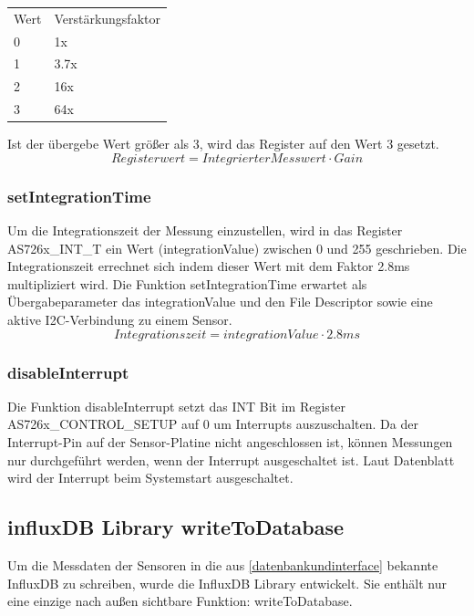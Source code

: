 \begin{tabular}{ l l}
 	Wert & Verstärkungsfaktor \\ 
 	0 & 1x \\  
 	1 & 3.7x \\
 	2 & 16x \\  
 	3 & 64x \\
\end{tabular}

Ist der übergebe Wert größer als 3, wird das Register auf den Wert 3 gesetzt.
\begin{equation}
	Registerwert = Integrierter Messwert \cdot Gain
\end{equation}

\subsubsection{setIntegrationTime}
Um die Integrationszeit der Messung einzustellen, wird in das Register AS726x\_INT\_T ein Wert (integrationValue) zwischen 0 und 255 geschrieben. Die Integrationszeit errechnet sich indem dieser Wert mit dem Faktor 2.8ms multipliziert wird.
Die Funktion setIntegrationTime erwartet als Übergabeparameter das integrationValue und den File Descriptor sowie eine aktive I2C-Verbindung zu einem Sensor.\\
\begin{equation}
	Integrationszeit = integrationValue\cdot2.8ms
\end{equation}

\subsubsection{disableInterrupt}
Die Funktion disableInterrupt setzt das INT Bit im Register AS726x\_CONTROL\_SETUP auf 0 um Interrupts auszuschalten.
Da der Interrupt-Pin auf der Sensor-Platine nicht angeschlossen ist, können Messungen nur durchgeführt werden, wenn der Interrupt ausgeschaltet ist.
Laut Datenblatt wird der Interrupt beim Systemstart ausgeschaltet.

\subsection{influxDB Library writeToDatabase}\label{influxDB-Library}
Um die Messdaten der Sensoren in die aus \ref{datenbankundinterface} bekannte InfluxDB zu schreiben, wurde die InfluxDB Library entwickelt. Sie enthält nur eine einzige nach außen sichtbare Funktion: writeToDatabase.
